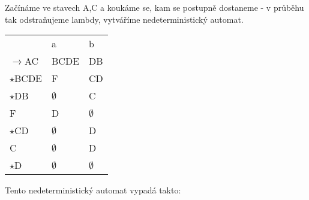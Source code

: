 \documentclass{article}
\begin{document}
Začínáme ve stavech A,C a koukáme se, kam se postupně dostaneme -
v průběhu tak odstraňujeme lambdy, vytváříme nedeterministický automat. 

\begin{table}[]
    \begin{tabular}{lll}
                              & a                                & b                                \\ \cline{2-3} 
    \multicolumn{1}{l|}{$\rightarrow$AC}   & \multicolumn{1}{l|}{BCDE}        & \multicolumn{1}{l|}{DB}          \\ \cline{2-3} 
    \multicolumn{1}{l|}{$\star$BCDE} & \multicolumn{1}{l|}{F}           & \multicolumn{1}{l|}{CD}          \\ \cline{2-3} 
    \multicolumn{1}{l|}{$\star$DB}   & \multicolumn{1}{l|}{$\emptyset$} & \multicolumn{1}{l|}{C}           \\ \cline{2-3} 
    \multicolumn{1}{l|}{F}    & \multicolumn{1}{l|}{D}           & \multicolumn{1}{l|}{$\emptyset$} \\ \cline{2-3} 
    \multicolumn{1}{l|}{$\star$CD}   & \multicolumn{1}{l|}{$\emptyset$} & \multicolumn{1}{l|}{D} \\ \cline{2-3} 
    \multicolumn{1}{l|}{C}    & \multicolumn{1}{l|}{$\emptyset$} & \multicolumn{1}{l|}{D} \\ \cline{2-3} 
    \multicolumn{1}{l|}{$\star$D}    & \multicolumn{1}{l|}{$\emptyset$} & \multicolumn{1}{l|}{$\emptyset$} \\ \cline{2-3} 
    \end{tabular}
    \end{table}
Tento nedeterministický automat vypadá takto:\\\\
\end{document}
